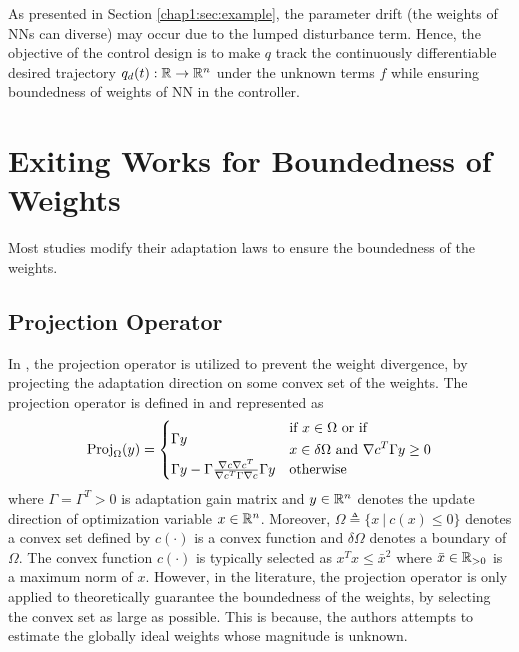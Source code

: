 As presented in Section \ref{chap1:sec:example}, the parameter drift (\ie the weights of NNs can diverse) may occur due to the lumped disturbance term.
Hence, the objective of the control design is to make $q$ track the continuously differentiable desired trajectory $q_d(t):\mathbb{R}\to \mathbb{R}^n$ under the unknown terms $f$ while ensuring boundedness of weights of NN in the controller.

\section{Exiting Works for Boundedness of Weights} 

Most studies modify their adaptation laws to ensure the boundedness of the weights.

\subsection{Projection Operator} \label{chap3:sec:proj}

In \cite{RN13, RN11, RN21}, the projection operator is utilized to prevent the weight divergence, by projecting the adaptation direction on some convex set of the weights.
The projection operator is defined in \cite[Appendix E, eq.~(E.4)]{RN7} and represented as
\begin{equation}
    \text{Proj}_\Omega(y)
    =
    \begin{cases}
        \Gamma y
        &
        \begin{aligned}
            &\text{if }x\in\Omega
            \text{ or if }\\
            &x\in\delta\Omega
            \text{ and }
            \nabla c^T\Gamma y\ge0
        \end{aligned}
        \\
        \Gamma y
        -
        \Gamma
        {\nabla c\nabla c^T\over \nabla c^T \Gamma \nabla c}
        \Gamma y
        &
        \text{otherwise}
    \end{cases}
    \label{chap3:eq:proj}
\end{equation}
where $\Gamma=\Gamma^T>0$ is adaptation gain matrix and $y\in\mathbb{R}^n$ denotes the update direction of optimization variable $x\in\mathbb{R}^n$.
Moreover, $\Omega\triangleq \{x\ \vert\ c(x)\le 0\}$ denotes a convex set defined by $c(\cdot)$ is a convex function and $\delta\Omega$ denotes a boundary of $\Omega$.
The convex function $c(\cdot)$ is typically selected as $x^Tx\le \bar x^2$ where $\bar x\in\mathbb{R}_{>0}$ is a maximum norm of $x$.
However, in the literature, the projection operator is only applied to theoretically guarantee the boundedness of the weights, by selecting the convex set as large as possible.
This is because, the authors attempts to estimate the globally ideal weights whose magnitude is unknown.

